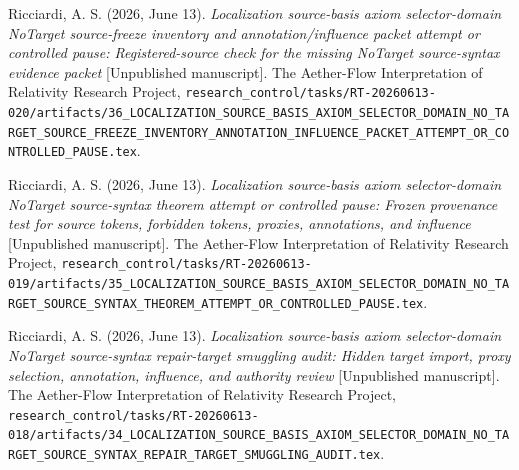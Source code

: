 \documentclass[11pt]{article}
\begin{document}
Ricciardi, A. S. (2026, June 13). \emph{Localization source-basis axiom
selector-domain NoTarget source-freeze inventory and annotation/influence
packet attempt or controlled pause: Registered-source check for the missing
NoTarget source-syntax evidence packet} [Unpublished manuscript]. The
Aether-Flow Interpretation of Relativity Research Project,
\texttt{research\_control/tasks/RT-20260613-020/artifacts/36\_LOCALIZATION\_SOURCE\_BASIS\_AXIOM\_SELECTOR\_DOMAIN\_NO\_TARGET\_SOURCE\_FREEZE\_INVENTORY\_ANNOTATION\_INFLUENCE\_PACKET\_ATTEMPT\_OR\_CONTROLLED\_PAUSE.tex}.

Ricciardi, A. S. (2026, June 13). \emph{Localization source-basis axiom
selector-domain NoTarget source-syntax theorem attempt or controlled pause:
Frozen provenance test for source tokens, forbidden tokens, proxies,
annotations, and influence} [Unpublished manuscript]. The Aether-Flow
Interpretation of Relativity Research Project,
\texttt{research\_control/tasks/RT-20260613-019/artifacts/35\_LOCALIZATION\_SOURCE\_BASIS\_AXIOM\_SELECTOR\_DOMAIN\_NO\_TARGET\_SOURCE\_SYNTAX\_THEOREM\_ATTEMPT\_OR\_CONTROLLED\_PAUSE.tex}.

Ricciardi, A. S. (2026, June 13). \emph{Localization source-basis axiom
selector-domain NoTarget source-syntax repair-target smuggling audit:
Hidden target import, proxy selection, annotation, influence, and authority
review} [Unpublished manuscript]. The Aether-Flow Interpretation of
Relativity Research Project,
\texttt{research\_control/tasks/RT-20260613-018/artifacts/34\_LOCALIZATION\_SOURCE\_BASIS\_AXIOM\_SELECTOR\_DOMAIN\_NO\_TARGET\_SOURCE\_SYNTAX\_REPAIR\_TARGET\_SMUGGLING\_AUDIT.tex}.
\end{document}
